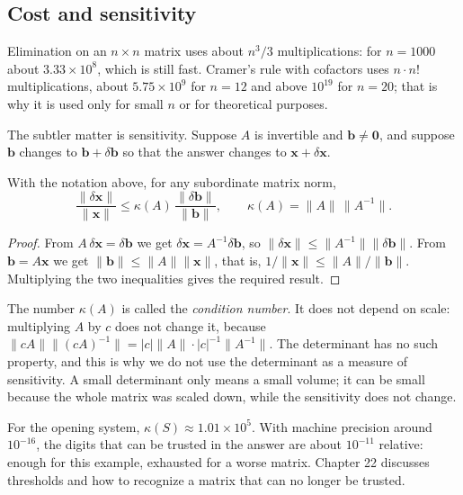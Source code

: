 \subsection*{Cost and sensitivity}

Elimination on an $n\times n$ matrix uses about $n^{3}/3$ multiplications: for $n=1000$ about
$3.33\times10^{8}$, which is still fast. Cramer's rule with cofactors uses $n\cdot n!$
multiplications, about $5.75\times10^{9}$ for $n=12$ and above $10^{19}$ for $n=20$; that is
why it is used only for small $n$ or for theoretical purposes.

The subtler matter is sensitivity. Suppose $A$ is invertible and $\mathbf{b}\neq\mathbf{0}$, and
suppose $\mathbf{b}$ changes to $\mathbf{b}+\delta\mathbf{b}$ so that the answer changes to
$\mathbf{x}+\delta\mathbf{x}$.

\begin{teorema}
With the notation above, for any subordinate matrix norm,
\[
  \frac{\lVert\delta\mathbf{x}\rVert}{\lVert\mathbf{x}\rVert}
  \le\kappa(A)\,
  \frac{\lVert\delta\mathbf{b}\rVert}{\lVert\mathbf{b}\rVert},
  \qquad \kappa(A)=\lVert A\rVert\,\lVert A^{-1}\rVert .
\]
\end{teorema}

\begin{proof}
From $A\,\delta\mathbf{x}=\delta\mathbf{b}$ we get $\delta\mathbf{x}=A^{-1}\delta\mathbf{b}$, so
$\lVert\delta\mathbf{x}\rVert\le\lVert A^{-1}\rVert\lVert\delta\mathbf{b}\rVert$. From
$\mathbf{b}=A\mathbf{x}$ we get $\lVert\mathbf{b}\rVert\le\lVert A\rVert\lVert\mathbf{x}\rVert$,
that is, $1/\lVert\mathbf{x}\rVert\le\lVert A\rVert/\lVert\mathbf{b}\rVert$. Multiplying the two
inequalities gives the required result.
\end{proof}

The number $\kappa(A)$ is called the \emph{condition number}. It does not depend on scale:
multiplying $A$ by $c$ does not change it, because $\lVert cA\rVert\lVert (cA)^{-1}\rVert
=|c|\lVert A\rVert\cdot|c|^{-1}\lVert A^{-1}\rVert$. The determinant has no such property, and
this is why we do not use the determinant as a measure of sensitivity. A small determinant only
means a small volume; it can be small because the whole matrix was scaled down, while the
sensitivity does not change.

For the opening system, $\kappa(S)\approx1.01\times10^{5}$. With machine precision around
$10^{-16}$, the digits that can be trusted in the answer are about $10^{-11}$ relative: enough
for this example, exhausted for a worse matrix. Chapter 22 discusses thresholds and how to
recognize a matrix that can no longer be trusted.

